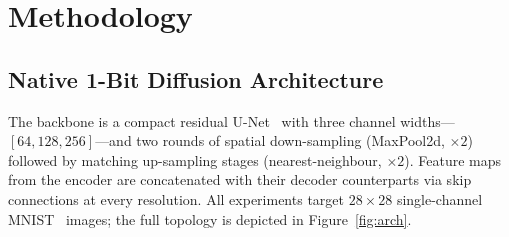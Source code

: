 \documentclass[twocolumn, journal]{IEEEtran}
\begin{document}
\section{Methodology}

\subsection{Native 1-Bit Diffusion Architecture}

The backbone is a compact residual U-Net~\cite{ronneberger2015unet} with three channel
widths---$[64, 128, 256]$---and two rounds of spatial down-sampling (MaxPool2d,
$\times2$) followed by matching up-sampling stages (nearest-neighbour, $\times2$).
Feature maps from the encoder are concatenated with their decoder counterparts via skip
connections at every resolution. All experiments target $28{\times}28$ single-channel
MNIST~\cite{lecun1998mnist} images; the full topology is depicted in
Figure~\ref{fig:arch}.
\end{document}
